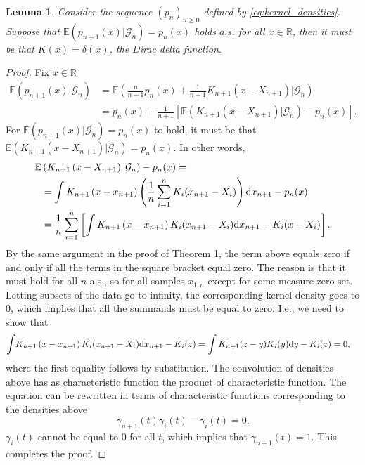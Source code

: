 \documentclass{article}
\newtheorem{lemma}{Lemma}
\theoremstyle{definition}
\newcommand{\di}{{\rm d}}
\renewcommand{\&}{and}
\begin{document}
\begin{lemma}\label{lem:kernel.density} Consider the sequence $(p_n)_{n \geq 0}$ defined by \eqref{eq:kernel_densities}. Suppose that $\mathbb{E}(p_{n+1}(x)|\mathcal{G}_{n})=p_{n}(x)$ holds $a.s.$ for all $x \in \mathbb{R}$, then it must be that $K(x)=\delta(x)$, the Dirac delta function. 
\end{lemma}

\begin{proof} Fix $x \in \mathbb{R}$
		\begin{align}
 \mathbb{E}\left( p_{n+1}(x) |\mathcal{G}_{n}\right) 
		&=  \mathbb{E}\left( \frac{n}{n+1}p_{n}(x)+\frac{1}{n+1} K_{n+1}\left(x-X_{n+1}\right) |\mathcal{G}_{n}\right) \nonumber \\
		&=  p_{n}(x)+\frac{1}{n+1}  \left[\mathbb{E}\left( K_{n+1}\left(x-X_{n+1}\right)   |\mathcal{G}_{n}\right) -p_{n}(x)\right]. \nonumber
	\end{align}
For $\mathbb{E}(p_{n+1}(x)|\mathcal{G}_{n})=p_{n}(x)$ to hold, it must be that $\mathbb{E}\left( K_{n+1}\left(x-X_{n+1}\right)   |\mathcal{G}_{n}\right)=p_{n}(x)$. In other words,
\begin{align*}
    \mathbb{E} & \left( K_{n+1}\left(x-X_{n+1}\right)   |\mathcal{G}_{n}\right)-p_{n}(x) = \\
    & =\int K_{n+1}\left(x-x_{n+1}\right)\left( \frac{1}{n} \sum_{i=1}^n K_i (x_{n+1} -X_i) \right)\di x_{n+1}-p_{n}(x) \\
    &=\frac{1}{n}\sum_{i=1}^n \left[  \int K_{n+1}\left(x-x_{n+1}\right) K_i (x_{n+1} -X_i) \di x_{n+1}-K_i(x-X_i)\right].
\end{align*}
By the same argument in the proof of  \cite{west1991kernel} Theorem 1, the term above equals zero if and only if all the terms in the square bracket equal zero. The reason is that it must hold for all $n$ a.s., so for all samples $x_{1:n}$ except for some measure zero set. Letting subsets of the data go to infinity, the corresponding kernel density goes to $0$, which implies that all the summands must be equal to zero. I.e., we need to show that
\begin{align*}
\int & K_{n+1}\left(x-x_{n+1}\right)  K_i (x_{n+1} -X_i) \di x_{n+1}-K_i (z) 
=\int K_{n+1}(z-y) K_i(y) \di y - K_i (z)=0,
\end{align*}
where the first equality follows by substitution. The convolution of densities above has as characteristic function the product of characteristic function. The equation can be rewritten in terms of characteristic functions corresponding to the densities above
\[
\gamma_{n+1}(t)\gamma_i(t) -\gamma_i(t)=0.
\]
$\gamma_i(t)$ cannot be equal to $0$ for all $t$, which implies that $\gamma_{n+1}(t)=1$. This completes the proof.
\end{proof}
\end{document}
